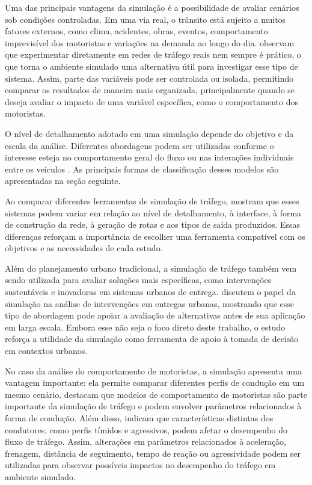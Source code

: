 Uma das principais vantagens da simulação é a possibilidade de avaliar cenários sob condições controladas. Em uma via real, o trânsito está sujeito a muitos fatores externos, como clima, acidentes, obras, eventos, comportamento imprevisível dos motoristas e variações na demanda ao longo do dia.  observam que experimentar diretamente em redes de tráfego reais nem sempre é prático, o que torna o ambiente simulado uma alternativa útil para investigar esse tipo de sistema. Assim, parte das variáveis pode ser controlada ou isolada, permitindo comparar os resultados de maneira mais organizada, principalmente quando se deseja avaliar o impacto de uma variável específica, como o comportamento dos motoristas.

O nível de detalhamento adotado em uma simulação depende do objetivo e da escala da análise. Diferentes abordagens podem ser utilizadas conforme o interesse esteja no comportamento geral do fluxo ou nas interações individuais entre os veículos \cite{algherbal_2025}. As principais formas de classificação desses modelos são apresentadas na seção seguinte.

Ao comparar diferentes ferramentas de simulação de tráfego,  mostram que esses sistemas podem variar em relação ao nível de detalhamento, à interface, à forma de construção da rede, à geração de rotas e aos tipos de saída produzidos. Essas diferenças reforçam a importância de escolher uma ferramenta compatível com os objetivos e as necessidades de cada estudo.

Além do planejamento urbano tradicional, a simulação de tráfego também vem sendo utilizada para avaliar soluções mais específicas, como intervenções sustentáveis e inovadoras em sistemas urbanos de entrega.  discutem o papel da simulação na análise de intervenções em entregas urbanas, mostrando que esse tipo de abordagem pode apoiar a avaliação de alternativas antes de sua aplicação em larga escala. Embora esse não seja o foco direto deste trabalho, o estudo reforça a utilidade da simulação como ferramenta de apoio à tomada de decisão em contextos urbanos.

No caso da análise do comportamento de motoristas, a simulação apresenta uma vantagem importante: ela permite comparar diferentes perfis de condução em um mesmo cenário.  destacam que modelos de comportamento de motoristas são parte importante da simulação de tráfego e podem envolver parâmetros relacionados à forma de condução. Além disso,  indicam que características distintas dos condutores, como perfis tímidos e agressivos, podem afetar o desempenho do fluxo de tráfego. Assim, alterações em parâmetros relacionados à aceleração, frenagem, distância de seguimento, tempo de reação ou agressividade podem ser utilizadas para observar possíveis impactos no desempenho do tráfego em ambiente simulado.

